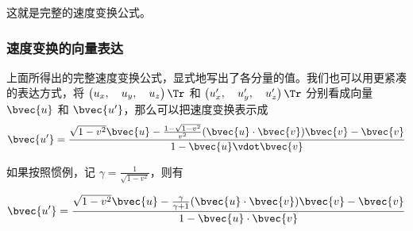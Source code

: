 这就是完整的速度变换公式。

\subsubsection{速度变换的向量表达}

上面所得出的完整速度变换公式，显式地写出了各分量的值。我们也可以用更紧凑的表达方式，将 $\left(\begin{matrix}u_x,\quad u_y,\quad u_z\end{matrix} \right)\Tr $ 和 $\left(\begin{matrix}u_x',\quad u_y',\quad u_z'\end{matrix} \right)\Tr$ 分别看成向量 $\bvec{u}$ 和 $\bvec{u'}$，那么可以把速度变换表示成
\begin{equation}\label{RelVel_eq5}
\bvec{u'}=\frac{\sqrt{1-v^2}\bvec{u}-\frac{1-\sqrt{1-v^2}}{v^2}(\bvec{u}\cdot\bvec{v})\bvec{v}-\bvec{v}}{1-\bvec{u}\vdot\bvec{v}}
\end{equation}

如果按照惯例，记 $\gamma=\frac{1}{\sqrt{1-v^2}}$，则有

\begin{equation}
\bvec{u'}=\frac{\sqrt{1-v^2}\bvec{u}-\frac{\gamma}{\gamma+1}(\bvec{u}\cdot\bvec{v})\bvec{v}-\bvec{v}}{1-\bvec{u}\cdot\bvec{v}}
\end{equation}




